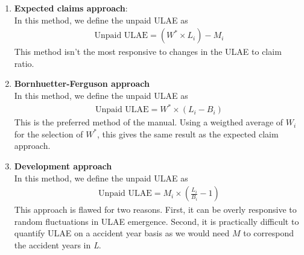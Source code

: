 \documentclass[11pt, english]{memoir}
\numberwithin{definition}{section}
\begin{document}
	\begin{enumerate}
		\item \textbf{Expected claims approach}:\\
		In this method, we define the unpaid ULAE as
		\begin{align*}
		\text{Unpaid ULAE} = (W^{*} \times L_{i}) - M_{i}
		\end{align*}
		This method isn't the most responsive to changes in the ULAE to claim ratio.\\
		
		
		\item \textbf{Bornhuetter-Ferguson approach}\\
		In this method, we define the unpaid ULAE as
		\begin{align*}
		\text{Unpaid ULAE} = W^{*} \times (L_{i} - B_{i})
		\end{align*}
		This is the preferred method of the manual. Using a weigthed average of $ W_{i} $ for the selection of $ W^{*} $, this gives the same result as the expected claim approach. \\
		
		
		\item \textbf{Development approach}\\
		In this method, we define the unpaid ULAE as
		\begin{align*}
		\text{Unpaid ULAE} = M_{i}\times (\frac{L_{i}}{B_{i}} - 1)
		\end{align*}
		This approach is flawed for two reasons. First, it can be overly responsive to random fluctuations in ULAE emergence. Second, it is practically difficult to quantify ULAE on a accident year basis as we would need $ M $ to correspond the accident years in \emph{L}.
	\end{enumerate}
\end{document}
